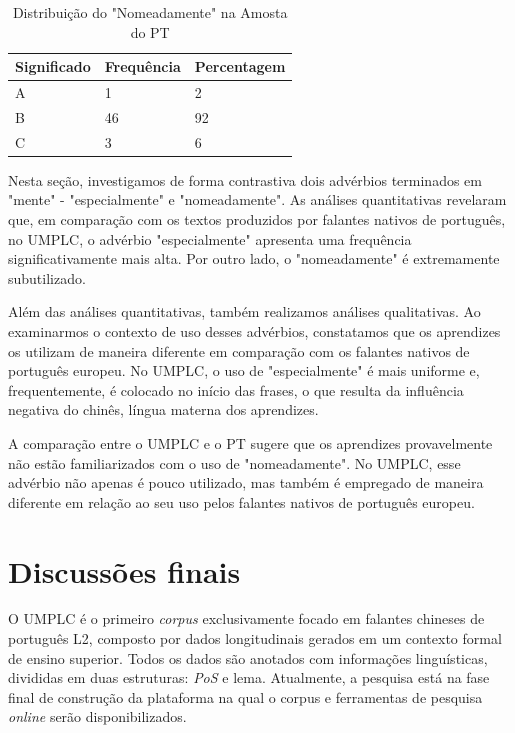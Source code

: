 \documentclass[portuguese]{textolivre}
\begin{document}
\begin{table}[h]
\centering
\begin{threeparttable}
\caption{Distribuição do "Nomeadamente" na Amosta do PT}
\label{tab12}
\begin{tabular}{lll}
\toprule
Significado & Frequência & Percentagem \\ 
\midrule
A           & 1          & 2           \\ 
B           & 46         & 92          \\ 
C           & 3          & 6           \\ 
\bottomrule
\end{tabular}
\end{threeparttable}
\end{table}

Nesta seção, investigamos de forma contrastiva dois advérbios terminados em "mente" - "especialmente" e "nomeadamente". As análises quantitativas revelaram que, em comparação com os textos produzidos por falantes nativos de português, no UMPLC, o advérbio "especialmente" apresenta uma frequência significativamente mais alta. Por outro lado, o "nomeadamente" é extremamente subutilizado.

Além das análises quantitativas, também realizamos análises qualitativas. Ao examinarmos o contexto de uso desses advérbios, constatamos que os aprendizes os utilizam de maneira diferente em comparação com os falantes nativos de português europeu. No UMPLC, o uso de "especialmente" é mais uniforme e, frequentemente, é colocado no início das frases, o que resulta da influência negativa do chinês, língua materna dos aprendizes.

A comparação entre o UMPLC e o PT sugere que os aprendizes provavelmente não estão familiarizados com o uso de "nomeadamente". No UMPLC, esse advérbio não apenas é pouco utilizado, mas também é empregado de maneira diferente em relação ao seu uso pelos falantes nativos de português europeu.

\section{Discussões finais}\label{sec-conclusao}

O UMPLC é o primeiro \textit{corpus} exclusivamente focado em falantes chineses de português L2, composto por dados longitudinais gerados em um contexto formal de ensino superior. Todos os dados são anotados com informações linguísticas, divididas em duas estruturas: \textit{PoS} e lema. Atualmente, a pesquisa está na fase final de construção da plataforma na qual o corpus e ferramentas de pesquisa \textit{online} serão disponibilizados.
\end{document}
